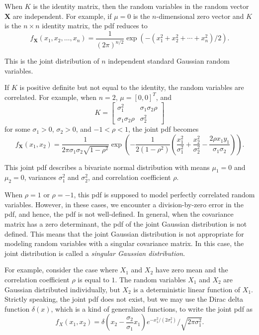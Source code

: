 When $K$ is the identity matrix, then the random variables in the random vector $\mathbf{X}$ are independent. For example, if $\mu=0$ is the $n$-dimensional zero vector and $K$ is the $n\times n$ identity matrix, the pdf reduces to
\[
f_{\mathbf{X}}(x_1,x_2,\dots,x_n)
=
\frac{1}{(2\pi)^{n/2}}
\exp\left(-(x_1^2+x_2^2+\cdots+x_n^2)/2\right).
\]

This is the joint distribution of $n$ independent standard Gaussian random variables.

If $K$ is positive definite but not equal to the identity, the random variables are correlated. For example, when $n=2$, $\mu=[0,0]^T$, and
\[
K=
\begin{bmatrix}
\sigma_1^2 & \sigma_1\sigma_2\rho\\
\sigma_1\sigma_2\rho & \sigma_2^2
\end{bmatrix}
\]
for some $\sigma_1>0$, $\sigma_2>0$, and $-1<\rho<1$, the joint pdf becomes
\begin{equation}
f_{\mathbf{X}}(x_1,x_2)
=
\frac{1}{2\pi\sigma_1\sigma_2\sqrt{1-\rho^2}}
\exp\left(
-\frac{1}{2(1-\rho^2)}
\left(
\frac{x_1^2}{\sigma_1^2}
+
\frac{x_2^2}{\sigma_2^2}
-
\frac{2\rho x_1y_1}{\sigma_1\sigma_2}
\right)
\right).
\tag{1.3}
\end{equation}

This joint pdf describes a bivariate normal distribution with means $\mu_1=0$ and $\mu_2=0$, variances $\sigma_1^2$ and $\sigma_2^2$, and correlation coefficient $\rho$.

When $\rho=1$ or $\rho=-1$, this pdf is supposed to model perfectly correlated random variables. However, in these cases, we encounter a division-by-zero error in the pdf, and hence, the pdf is not well-defined. In general, when the covariance matrix has a zero determinant, the pdf of the joint Gaussian distribution is not defined. This means that the joint Gaussian distribution is not appropriate for modeling random variables with a singular covariance matrix. In this case, the joint distribution is called a \textit{singular Gaussian distribution}.

For example, consider the case where $X_1$ and $X_2$ have zero mean and the correlation coefficient $\rho$ is equal to $1$. The random variables $X_1$ and $X_2$ are Gaussian distributed individually, but $X_2$ is a deterministic linear function of $X_1$. Strictly speaking, the joint pdf does not exist, but we may use the Dirac delta function $\delta(x)$, which is a kind of generalized functions, to write the joint pdf as
\[
f_X(x_1,x_2)=\delta\left(x_2-\frac{\sigma_2}{\sigma_1}x_1\right)e^{-x_1^2/(2\sigma_1^2)}/\sqrt{2\pi\sigma_1^2}.
\]
